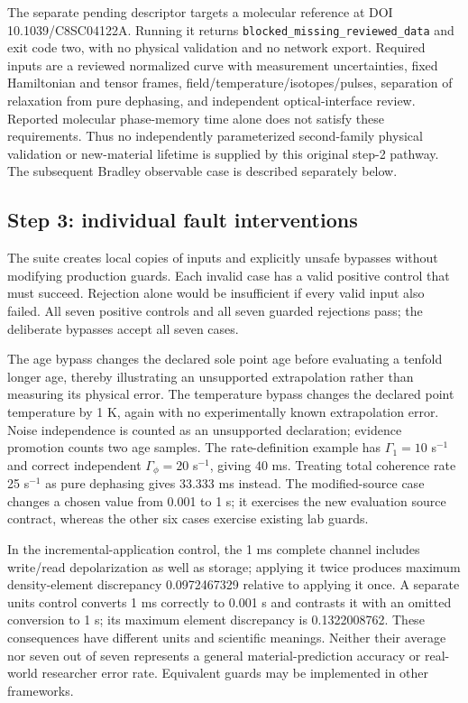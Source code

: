 \documentclass[10pt,a4paper]{article}
\newcommand{\code}[1]{\texttt{#1}}
\begin{document}
The separate pending descriptor targets a molecular reference at DOI 10.1039/C8SC04122A. Running it returns \code{blocked\_missing\_reviewed\_data} and exit code two, with no physical validation and no network export. Required inputs are a reviewed normalized curve with measurement uncertainties, fixed Hamiltonian and tensor frames, field/temperature/isotopes/pulses, separation of relaxation from pure dephasing, and independent optical-interface review. Reported molecular phase-memory time alone does not satisfy these requirements. Thus no independently parameterized second-family physical validation or new-material lifetime is supplied by this original step-2 pathway. The subsequent Bradley observable case is described separately below.

\subsection{Step 3: individual fault interventions}
The suite creates local copies of inputs and explicitly unsafe bypasses without modifying production guards. Each invalid case has a valid positive control that must succeed. Rejection alone would be insufficient if every valid input also failed. All seven positive controls and all seven guarded rejections pass; the deliberate bypasses accept all seven cases.


The age bypass changes the declared sole point age before evaluating a tenfold longer age, thereby illustrating an unsupported extrapolation rather than measuring its physical error. The temperature bypass changes the declared point temperature by 1 K, again with no experimentally known extrapolation error. Noise independence is counted as an unsupported declaration; evidence promotion counts two age samples. The rate-definition example has $\Gamma_1=10$ s$^{-1}$ and correct independent $\Gamma_\phi=20$ s$^{-1}$, giving 40 ms. Treating total coherence rate 25 s$^{-1}$ as pure dephasing gives 33.333 ms instead. The modified-source case changes a chosen value from 0.001 to 1 s; it exercises the new evaluation source contract, whereas the other six cases exercise existing lab guards.

In the incremental-application control, the 1 ms complete channel includes write/read depolarization as well as storage; applying it twice produces maximum density-element discrepancy 0.0972467329 relative to applying it once. A separate units control converts 1 ms correctly to 0.001 s and contrasts it with an omitted conversion to 1 s; its maximum element discrepancy is 0.1322008762. These consequences have different units and scientific meanings. Neither their average nor seven out of seven represents a general material-prediction accuracy or real-world researcher error rate. Equivalent guards may be implemented in other frameworks.
\end{document}

